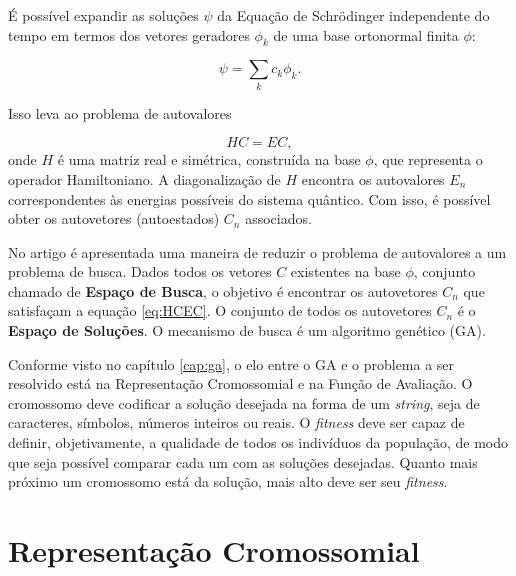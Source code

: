 
	É possível expandir as soluções $\psi$ da Equação de Schrödinger independente do tempo em termos dos vetores geradores $\phi_k$ de uma base ortonormal finita $\phi$:
	
	\begin{equation}
		\psi = \sum_k c_k \phi_k.
	\end{equation}
	
	Isso leva ao problema de autovalores
	
	\begin{equation}\label{eq:HCEC}
		HC = EC,
	\end{equation}
	onde $H$ é uma matriz real e simétrica, construída na base ${\phi}$, que representa o operador Hamiltoniano. A diagonalização de $H$ encontra os autovalores $E_n$ correspondentes às energias possíveis do sistema quântico. Com isso, é possível obter os autovetores (autoestados) $C_n$ associados.
	
	No artigo \cite{metodo2004} é apresentada uma maneira de reduzir o problema de autovalores a um problema de busca. Dados todos os vetores $C$ existentes na base $\phi$, conjunto chamado de \textbf{Espaço de Busca}, o objetivo é encontrar os autovetores $C_n$ que satisfaçam a equação \ref{eq:HCEC}. O conjunto de todos os autovetores $C_n$ é o \textbf{Espaço de Soluções}. O mecanismo de busca é um algoritmo genético (GA).
	
	Conforme visto no capítulo \ref{cap:ga}, o elo entre o GA e o problema a ser resolvido está na Representação Cromossomial e na Função de Avaliação. O cromossomo deve codificar a solução desejada na forma de um \emph{string}, seja de caracteres, símbolos, números inteiros ou reais. O \emph{fitness} deve ser capaz de definir, objetivamente, a qualidade de todos os indivíduos da população, de modo que seja possível comparar cada um com as soluções desejadas. Quanto mais próximo um cromossomo está da solução, mais alto deve ser seu \emph{fitness}.

	\section{Representação Cromossomial}
	
